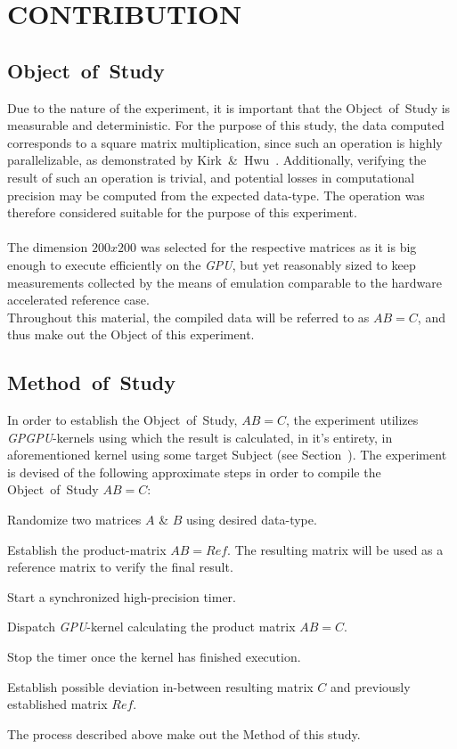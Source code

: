 
\section{CONTRIBUTION}
\label{sec:contribution}

\subsection{Object~of~Study}
\label{sec:contribution:objectofstudy}
Due to the nature of the experiment, it is important that the Object~of~Study is measurable and deterministic. For the purpose of this study, the data computed corresponds to a square matrix multiplication, since such an operation is highly parallelizable, as demonstrated by Kirk~\&~Hwu~\cite[ch.~3]{Kirk:2010:PMP:1841511}.
Additionally, verifying the result of such an operation is trivial, and potential losses in computational precision may be computed from the expected data-type.
The operation was therefore considered suitable for the purpose of this experiment.\\
\\
The dimension $200x200$ was selected for the respective matrices as it is big enough to execute efficiently on the \textit{GPU}, but yet reasonably sized to keep measurements collected by the means of emulation comparable to the hardware accelerated reference case.\\
Throughout this material, the compiled data will be referred to as $AB=C$, and thus make out the Object of this experiment.

\subsection{Method~of~Study}
\label{sec:contribution:methodofstudy}
In order to establish the Object~of~Study, $AB=C$, the experiment utilizes \textit{GPGPU}-kernels using which the result is calculated, in it’s entirety, in aforementioned kernel using some target Subject (see Section~).
The experiment is devised of the following approximate steps in order to compile the Object~of~Study $AB=C$:
\begin{enumerate*}
	\item Randomize two matrices $A$ \& $B$ using desired data-type.
	\item Establish the product-matrix $AB=Ref$. The resulting matrix will be used as a reference matrix to verify the final result.
	\item Start a synchronized high-precision timer.
	\item Dispatch \textit{GPU}-kernel calculating the product matrix $AB=C$.
	\item Stop the timer once the kernel has finished execution.
	\item Establish possible deviation in-between resulting matrix $C$ and previously established matrix $Ref$.
\end{enumerate*}
The process described above make out the Method of this study.


